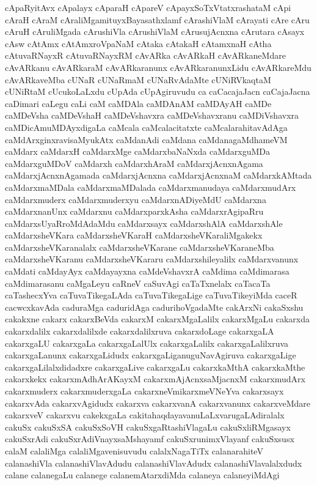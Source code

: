{cApaRyitAvx
cApalayx
cAparaH
cApareV
cApayxSoTxVtatxrashataM
cApi
cAraH
cAraM
cAraliMgamituyxBayasathxlamf
cArashiVlaM
cArayati
cAre
cAru
cAruH
cAruliMgada
cArushiVla
cArushiVlaM
cArusujAcnxna
cArutara
cAsayx
cAsw
cAtAmx
cAtAmxroVpaNaM
cAtaka
cAtakaH
cAtamxnaH
cAtha
cAtuvaRNayxR
cAtuvaRNayxRM
cAvARka
cAvARkaH
cAvARkaneMdare
cAvARkanu
cAvARkaraM
cAvARkaranunx
cAvARkaranunxLidu
cAvARkareMdu
cAvARkaveMba
cUNaR
cUNaRmaM
cUNaRvAdaMte
cUNiRVkaqtaM
cUNiRtaM
cUcukoLaLxdu
cUpAda
cUpAgiruvudu
ca
caCacajaJacn
caCajaJacna
caDimari
caLegu
caLi
caM
caMDAla
caMDAnAM
caMDAyAH
caMDe
caMDeVsha
caMDeVshaH
caMDeVshavxra
caMDeVshavxranu
caMDiVshavxra
caMDicAmuMDAyxdigaLa
caMcala
caMcalacitatxte
caMcalarahitavAdAga
caMdArxginxravisaMyukAtx
caMdanAdi
caMdana
caMdanagaMdhameVM
caMdarx
caMdarxH
caMdarxMge
caMdarxbaNaNxda
caMdarxguMDa
caMdarxguMDoV
caMdarxh
caMdarxhAraM
caMdarxjAcnxnAgama
caMdarxjAcnxnAgamada
caMdarxjAcnxna
caMdarxjAcnxnaM
caMdarxkAMtada
caMdarxmaMDala
caMdarxmaMDalada
caMdarxmanudaya
caMdarxmudArx
caMdarxmuderx
caMdarxmuderxyu
caMdarxnADiyeMdU
caMdarxna
caMdarxnanUnx
caMdarxnu
caMdarxparxkAsha
caMdarxrAgipaRru
caMdarxsUyaRroMdAdaMdu
caMdarxsayx
caMdarxshAlA
caMdarxshAle
caMdarxsheVKara
caMdarxsheVKaraH
caMdarxsheVKaraliMgakekx
caMdarxsheVKaranalalx
caMdarxsheVKarane
caMdarxsheVKaraneMba
caMdarxsheVKaranu
caMdarxsheVKararu
caMdarxshileyalilx
caMdarxvanunx
caMdati
caMdayAyx
caMdayayxna
caMdeVshavxrA
caMdima
caMdimarasa
caMdimarasanu
caMgaLeyu
caRneV
caSuvAgi
caTaTxnelalx
caTacaTa
caTashecxYva
caTuvaTikegaLAda
caTuvaTikegaLige
caTuvaTikeyiMda
caceR
cacwcxkavAda
caduraMga
caduridAga
cadurihoVgadaMte
cakArxNi
cakaSxshu
cakakxne
cakarx
cakarxBeVda
cakarxM
cakarxMgaLalilx
cakarxMgaLu
cakarxda
cakarxdalilx
cakarxdalilxde
cakarxdalilxruva
cakarxdoLage
cakarxgaLA
cakarxgaLU
cakarxgaLa
cakarxgaLalUlx
cakarxgaLalilx
cakarxgaLalilxruva
cakarxgaLanunx
cakarxgaLidudx
cakarxgaLiganuguNavAgiruva
cakarxgaLige
cakarxgaLilalxdidadxre
cakarxgaLive
cakarxgaLu
cakarxkaMthA
cakarxkaMthe
cakarxkekx
cakarxmAdhArAKayxM
cakarxmAjAcnxsaMjacnxM
cakarxmudArx
cakarxmuderx
cakarxmuderxgaLa
cakarxneVmikarxmeVNeYva
cakarxsayx
cakarxvAda
cakarxvAgidudx
cakarxva
cakarxvanA
cakarxvanunx
cakarxveMdare
cakarxveV
cakarxvu
cakekxgaLa
cakitahaqdayavanuLaLxvarugaLAdiralalx
cakuSx
cakuSxSA
cakuSxSoVH
cakuSxgaRtashiVlagaLu
cakuSxliRMgasayx
cakuSxrAdi
cakuSxrAdiVnayxsaMshayamf
cakuSxrunimxVlayanf
cakuSxsusx
calaM
calaliMga
calaliMgavenisuvudu
calalxNagaTiTx
calanarahiteV
calanashiVla
calanashiVlavAdudu
calanashiVlavAdudx
calanashiVlavalalxdudx
calane
calanegaLu
calanege
calanemAtarxdiMda
calaneya
calaneyiMdAgi
}
